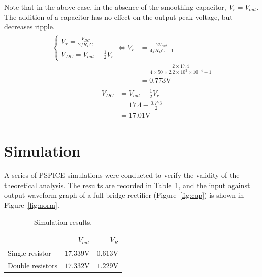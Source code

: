 \documentclass[12pt]{article}
\begin{document}
Note that in the above case, in the absence of the smoothing capacitor, $V_r=V_{out}$. The addition of a capacitor has no effect on the output peak voltage, but decreases ripple.
\begin{align}
\begin{split}
  \begin{cases}
  V_{r}=\frac{V_{DC}}{2f R_L C}\\
  V_{DC}=V_{out}-\frac{1}{2}V_r
  \end{cases}
  \Leftrightarrow
  V_{r}&=\frac{2V_{out}}{4fR_LC+1}\\
  &=\frac{2\times17.4}{4\times50\times2.2\times10^{3}\times10^{-4}+1}\\
  &=0.773\mathrm{V}
\label{eq:cap}
\end{split}
\end{align}
\begin{align}
  \begin{split}
    V_{DC}&=V_{out}-\frac{1}{2}V_r\\
    &=17.4-\frac{0.773}{2}\\
    &=17.01\mathrm{V}
  \end{split}
  \label{eq:capdc}
\end{align}

\section{Simulation}
\label{sec:sim}
A series of PSPICE simulations were conducted to verify the validity of the theoretical analysis. The results are recorded in Table~\ref{tab:sim}, and the input against output waveform graph of a full-bridge rectifier (Figure~\ref{fig:cap}) is shown in Figure~\ref{fig:norm}.
\begin{table}[h!]
\centering
\caption{Simulation results.}  
\begin{tabular}{|l|r|r|}
\hline
&$V_{out}$&$V_R$\\ \hline
Single resistor&$17.339\mathrm{V}$&$0.613\mathrm{V}$\\ \hline
Double resistors&$17.332\mathrm{V}$&$1.229\mathrm{V}$\\ \hline
\end{tabular}
\label{tab:sim}
\end{table}
\end{document}
